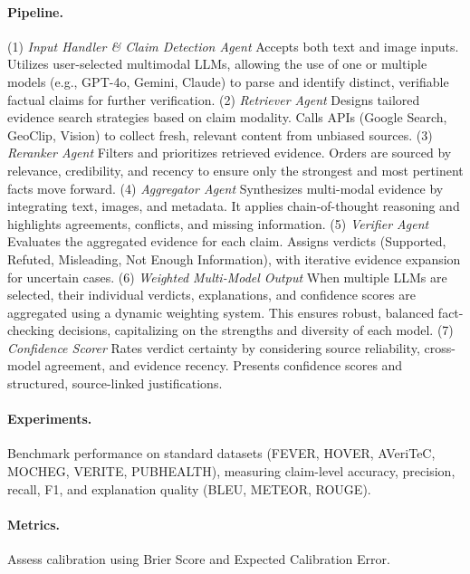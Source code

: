 \documentclass[11pt]{article}
\begin{document}
\paragraph{Pipeline.} (1) \emph{Input Handler \& Claim Detection Agent} Accepts both text and image inputs. Utilizes user-selected multimodal LLMs, allowing the use of one or multiple models (e.g., GPT-4o, Gemini, Claude) to parse and identify distinct, verifiable factual claims for further verification. (2) \emph{Retriever Agent} Designs tailored evidence search strategies based on claim modality. Calls APIs (Google Search, GeoClip, Vision) to collect fresh, relevant content from unbiased sources. (3) \emph{Reranker Agent} Filters and prioritizes retrieved evidence. Orders are sourced by relevance, credibility, and recency to ensure only the strongest and most pertinent facts move forward. (4) \emph{Aggregator Agent} Synthesizes multi-modal evidence by integrating text, images, and metadata. It applies chain-of-thought reasoning and highlights agreements, conflicts, and missing information. (5) \emph{Verifier Agent} Evaluates the aggregated evidence for each claim. Assigns verdicts (Supported, Refuted, Misleading, Not Enough Information), with iterative evidence expansion for uncertain cases. (6) \emph{Weighted Multi-Model Output} When multiple LLMs are selected, their individual verdicts, explanations, and confidence scores are aggregated using a dynamic weighting system. This ensures robust, balanced fact-checking decisions, capitalizing on the strengths and diversity of each model. (7) \emph{Confidence Scorer} Rates verdict certainty by considering source reliability, cross-model agreement, and evidence recency. Presents confidence scores and structured, source-linked justifications.

\paragraph {Experiments.} Benchmark performance on standard datasets (FEVER, HOVER, AVeriTeC, MOCHEG, VERITE, PUBHEALTH), measuring claim-level accuracy, precision, recall, F1, and explanation quality (BLEU, METEOR, ROUGE).

\paragraph{Metrics.} Assess calibration using Brier Score and Expected Calibration Error.
\end{document}

